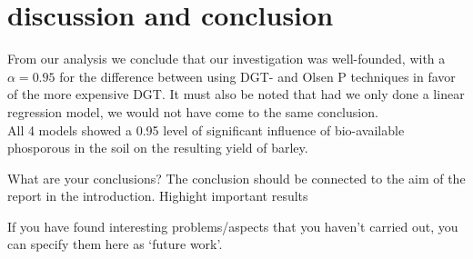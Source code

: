 \documentclass{article}
\begin{document}
\section{discussion and conclusion}

From our analysis we conclude that our investigation was well-founded, with a $\alpha = 0.95$ for the difference between using DGT- and Olsen P techniques in favor of the more expensive DGT. It  must also be noted that had we only done a linear regression model, we would not have come to the same conclusion. \\ All 4 models showed a 0.95 level of significant influence of bio-available phosporous in the soil on the resulting yield of barley.

What are your conclusions? The conclusion should be connected to the aim of the report in the introduction.
	Highight important results
	
If you have found interesting problems/aspects that you haven’t carried out, you can specify them here as ‘future work’.
\end{document}
